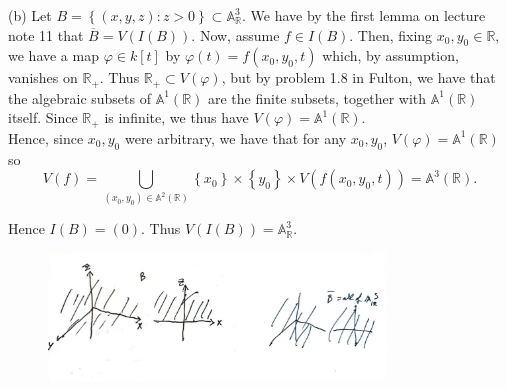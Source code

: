 \documentclass[a4paper]{article}
\begin{document}
    (b) Let $B = \left\{ \left( x,y,z \right)  \colon z>0 \right\} 
    \subset \mathbb{A}_{\mathbb{R}}^{3}$. We have by the first lemma on lecture
    note 11 that 
    $\overline{B} = V\left( I\left( B \right)  \right) $. Now, assume
    $f \in I(B)$. Then, fixing $x_0, y_0 \in \mathbb{R}$, we have
    a map $\varphi \in k\left[ t \right]  $ by
    $\varphi(t) = f\left( x_0, y_0, t \right) $ which, by assumption, 
    vanishes on $\mathbb{R}_+$. Thus $\mathbb{R}_+ \subset V\left( \varphi
    \right) $, but by problem 1.8 in Fulton, we have that
    the algebraic subsets of $\mathbb{A}^{1} (\mathbb{R})$ are the finite
    subsets, together with $\mathbb{A}^{1} (\mathbb{R})$ itself. Since
    $\mathbb{R}_+$ is infinite, we thus have
    $V(\varphi) = \mathbb{A}^{1}(\mathbb{R})$.\\
    Hence, since $ x_0, y_0$ were arbitrary, we have
    that for any  $x_0, y_0$, $V(\varphi) = \mathbb{A}^{1}(\mathbb{R})$ so
    $$V(f) = \bigcup_{\left( x_0,y_0 \right) \in \mathbb{A}^{2}(\mathbb{R})} 
    \left\{ x_0 \right\} \times \left\{ y_0 \right\} \times 
    V\left( f\left( x_0, y_0, t \right)  \right) 
    = \mathbb{A}^{3}\left( \mathbb{R} \right). $$
 
    Hence $I(B) = (0)$. Thus $V\left( I\left( B \right)  \right) = 
    \mathbb{A}_{\mathbb{R}}^{3}$.



\begin{figure}[H]
    \centering
    \includegraphics[width=0.8\textwidth]{2.jpg}
    \label{fig:2-jpg}
\end{figure}
\end{document}
